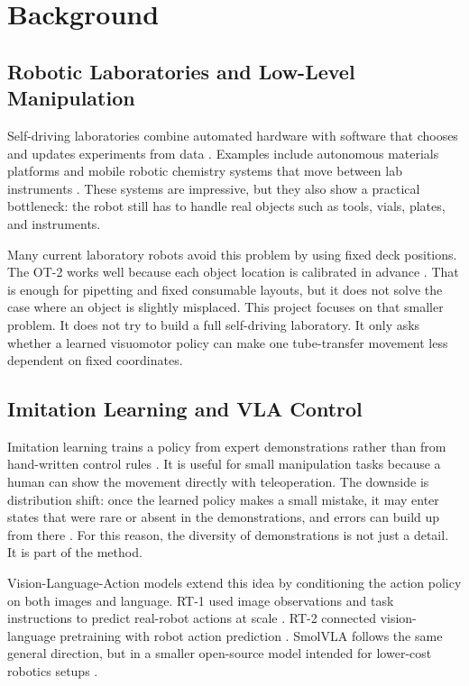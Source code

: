 \documentclass[11pt, a4paper]{article}
\begin{document}
\section{Background}
\label{sec:background}

\subsection{Robotic Laboratories and Low-Level Manipulation}

Self-driving laboratories combine automated hardware with software that chooses and updates experiments from data \parencite{tom2024selfdriving}. Examples include autonomous materials platforms \parencite{macleod2020selfdriving} and mobile robotic chemistry systems that move between lab instruments \parencite{burger2020mobile}. These systems are impressive, but they also show a practical bottleneck: the robot still has to handle real objects such as tools, vials, plates, and instruments.

Many current laboratory robots avoid this problem by using fixed deck positions. The OT-2 works well because each object location is calibrated in advance \parencite{bolt2025platehandler}. That is enough for pipetting and fixed consumable layouts, but it does not solve the case where an object is slightly misplaced. This project focuses on that smaller problem. It does not try to build a full self-driving laboratory. It only asks whether a learned visuomotor policy can make one tube-transfer movement less dependent on fixed coordinates.

\subsection{Imitation Learning and VLA Control}

Imitation learning trains a policy from expert demonstrations rather than from hand-written control rules \parencite{hussein2017imitation}. It is useful for small manipulation tasks because a human can show the movement directly with teleoperation. The downside is distribution shift: once the learned policy makes a small mistake, it may enter states that were rare or absent in the demonstrations, and errors can build up from there \parencite{ross2011dagger}. For this reason, the diversity of demonstrations is not just a detail. It is part of the method.

Vision-Language-Action models extend this idea by conditioning the action policy on both images and language. RT-1 used image observations and task instructions to predict real-robot actions at scale \parencite{brohan2023rt1}. RT-2 connected vision-language pretraining with robot action prediction \parencite{zitkovich2023rt2}. SmolVLA follows the same general direction, but in a smaller open-source model intended for lower-cost robotics setups \parencite{shukor2025smolvla}.
\end{document}
